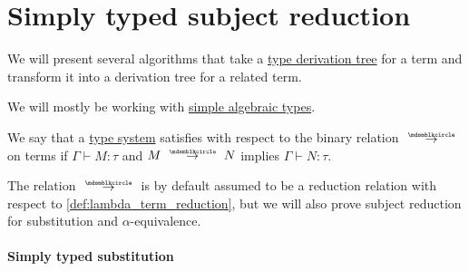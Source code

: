 \section{Simply typed subject reduction}\label{sec:simply_typed_subject_reduction}

We will present several algorithms that take a \hyperref[def:type_derivation_tree]{type derivation tree} for a term and transform it into a derivation tree for a related term.

We will mostly be working with \hyperref[def:simple_algebraic_types]{simple algebraic types}.

\begin{concept}\label{con:subject_reduction}
  We say that a \hyperref[def:abstract_type_system]{type system} satisfies  with respect to the binary relation \( {\pred} \) on terms if \( \Gamma \vdash M: \tau \) and \( M \pred N \) implies \( \Gamma \vdash N: \tau \).
\end{concept}
\begin{comments}
  \item The relation \( {\pred} \) is by default assumed to be a reduction relation with respect to \cref{def:lambda_term_reduction}, but we will also prove subject reduction for substitution and \( \alpha \)-equivalence.
\end{comments}

\paragraph{Simply typed substitution}

